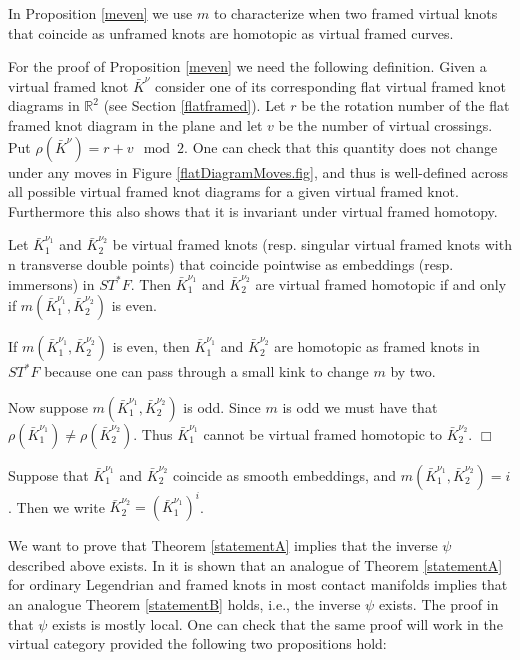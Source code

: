 In Proposition \ref{meven} we use $m$ to characterize when two framed virtual knots that coincide as unframed knots are homotopic as virtual framed curves.

For the proof of Proposition \ref{meven} we need the following definition.  Given a virtual framed knot $\bar{K}^\nu$ consider one of its corresponding flat virtual framed knot diagrams in $\mathbb{R}^2$ (see Section \ref{flatframed}).  Let $r$ be the rotation number of the flat framed knot diagram in the plane and let $v$ be the number of virtual crossings.  Put $\rho(\bar{K}^\nu) = r + v \mod{2}$.  One can check that this quantity does not change under any moves in Figure \ref{flatDiagramMoves.fig}, and thus is well-defined across all possible virtual framed knot diagrams for a given virtual framed knot. Furthermore this also shows that it is invariant under virtual framed homotopy. 

\begin{prop} \label{meven}
Let $\bar{K}_1^{\nu_1}$ and $\bar{K}_2^{\nu_2}$ be virtual framed knots (resp. singular virtual framed knots with n transverse double points) that coincide pointwise as embeddings (resp. immersons) in $ST^*F$.  Then $\bar{K}_1^{\nu_1}$ and $\bar{K}_2^{\nu_2}$ are virtual framed homotopic if and only if $m( \bar{K}_1^{\nu_1}, \bar{K}_2^{\nu_2})$ is even.
\end{prop}
\pp If $m( \bar{K}_1^{\nu_1}, \bar{K}_2^{\nu_2})$ is even, then $\bar{K}_1^{\nu_1}$ and $\bar{K}_2^{\nu_2}$ are homotopic as framed knots in $ST^*F$ because one can pass through a small kink to change $m$ by two.

Now suppose $m( \bar{K}_1^{\nu_1}, \bar{K}_2^{\nu_2})$ is odd.  Since $m$ is odd we must have that $\rho(\bar{K}_1^{\nu_1}) \neq \rho(\bar{K}_2^{\nu_2})$.  Thus $\bar{K}_1^{\nu_1}$ cannot be virtual framed homotopic to $\bar{K}_2^{\nu_2}$.
\hfill $\Box$

Suppose that $\bar{K}_1^{\nu_1}$ and $\bar{K}_2^{\nu_2}$ coincide as smooth embeddings, and $m(\bar{K}_1^{\nu_1}, \bar{K}_2^{\nu_2})=i$.  Then we write $\bar{K}_2^{\nu_2}=(\bar{K}_1^{\nu_1})^i$.



We want to prove that Theorem \ref{statementA} implies that the inverse $\psi$ described above exists. In \cite{Chernov} it is  shown that an analogue of Theorem \ref{statementA} for ordinary Legendrian and framed knots in most contact manifolds implies that an analogue Theorem \ref{statementB} holds, i.e., the inverse $\psi$ exists. The proof in \cite{Chernov} that $\psi$ exists is mostly local.  One can check that the same proof will work in the virtual category provided the following two propositions hold:

